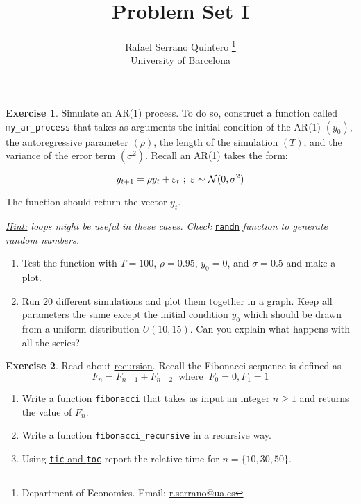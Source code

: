 \documentclass[a4paper,11pt]{article}
\title{\textbf{Problem Set I}}
\author{Rafael Serrano Quintero
\thanks{Department of Economics. Email: \href{mailto:r.serrano@ua.es}{r.serrano@ua.es}} \\
University of Barcelona \\}
\date{}
\theoremstyle{definition}
\newtheorem{exercise}{Exercise}
\begin{document}
\VerbatimFootnotes

\maketitle

\begin{exercise}
Simulate an AR(1) process. To do so, construct a function called \verb;my_ar_process; that takes as arguments the initial condition of the AR(1) $(y_0)$, the autoregressive parameter $(\rho)$, the length of the simulation $(T)$, and the variance of the error term $(\sigma^2)$. Recall an AR(1) takes the form:
    
\[
y_{t+1} = \rho y_t + \varepsilon_{t} \ ; \ \varepsilon\thicksim \mathcal{N}(0, \sigma^2)
\]

The function should return the vector $y_t$.

\textit{\underline{Hint:} loops might be useful in these cases. Check} \href{https://www.mathworks.com/help/matlab/ref/randn.html}{\texttt{randn}} \textit{function to generate random numbers.}

\begin{enumerate}
    \item Test the function with $T = 100$, $\rho = 0.95$, $y_0 = 0$, and $\sigma = 0.5$ and make a plot.
    \item Run $20$ different simulations and plot them together in a graph. Keep all parameters the same except the initial condition $y_0$ which should be drawn from a uniform distribution $U(10,15)$. Can you explain what happens with all the series?
\end{enumerate}
\end{exercise}

\begin{exercise}
Read about \href{https://en.wikipedia.org/wiki/Recursion_(computer_science)}{recursion}. Recall the Fibonacci sequence is defined as
\[
F_n = F_{n-1} + F_{n-2}  \ \text{ where } \ F_0 = 0, F_1 = 1
\]
\begin{enumerate}
    \item Write a function \verb;fibonacci; that takes as input an integer $n\geq 1$ and returns the value of $F_n$.
    \item Write a function \verb;fibonacci_recursive; in a recursive way.
    \item Using \href{https://www.mathworks.com/help/matlab/ref/tic.html}{\texttt{tic} and \texttt{toc}} report the relative time for $n = \{10,30,50\}$.
\end{enumerate}
\end{exercise}
\end{document}
